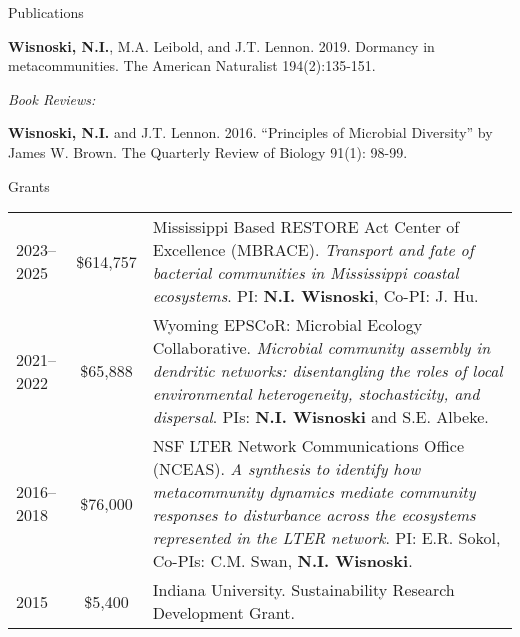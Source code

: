 \documentclass{resume} %
\begin{document}
\begin{rSection}{Publications}
\begin{etaremune}
\item {\bf Wisnoski, N.I.}, M.A. Leibold, and J.T. Lennon. 2019. Dormancy in metacommunities. The American Naturalist 194(2):135-151.

\end{etaremune}

\bigskip

{\it Book Reviews:}
\begin{etaremune}
\item {\bf Wisnoski, N.I.} and J.T. Lennon. 2016. \enquote{Principles of Microbial Diversity} by James W. Brown. The Quarterly Review of Biology 91(1): 98-99.

\end{etaremune}
\end{rSection}

\bigskip

\newpage
\begin{rSection}{Grants}

\begin{tabulary}{0.95\textwidth}{lcL}
2023--2025 & \$614,757 & Mississippi Based RESTORE Act Center of Excellence (MBRACE). \textit{Transport and fate of bacterial communities in Mississippi coastal ecosystems}. PI: {\bf N.I. Wisnoski}, Co-PI: J. Hu. \\

2021--2022 & \$65,888 & Wyoming EPSCoR: Microbial Ecology Collaborative. \textit{Microbial community assembly in dendritic networks: disentangling the roles of local environmental heterogeneity, stochasticity, and dispersal}. PIs: {\bf N.I. Wisnoski} and S.E. Albeke.\\

2016--2018 & \$76,000 & NSF LTER Network Communications Office (NCEAS). \textit{A synthesis to identify how metacommunity dynamics mediate community responses to disturbance across the ecosystems represented in the LTER network}. PI: E.R. Sokol, Co-PIs: C.M. Swan, {\bf N.I. Wisnoski}.\\

2015 & \$5,400 & Indiana University. Sustainability Research Development Grant.

\end{tabulary}
\end{rSection}

\bigskip
\end{document}
